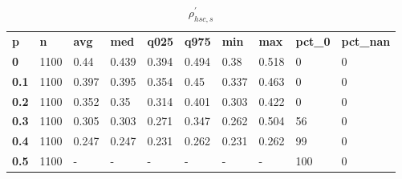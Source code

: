 \begin{table}[h]
 \centering 
\footnotesize
\caption{$\rho_{hsc,s}^\prime $}
\label{tab:alphahscs}
\begin{tabular}[h]{| l l l l l l l l l l|
    } \hline
\textbf{ p} & \textbf{ n} & \textbf{ avg} & \textbf{ med} & \textbf{ q025} & \textbf{ q975} & \textbf{ min} & \textbf{ max} & \textbf{ pct\_0} & \textbf{ pct\_nan}
           \\
  \textbf{  0} & 1100 &  0.44 & 0.439 & 0.394 & 0.494 &  0.38 & 0.518 &   0 & 0
           \\
  \textbf{0.1} & 1100 & 0.397 & 0.395 & 0.354 &  0.45 & 0.337 & 0.463 &   0 & 0
           \\
  \textbf{0.2} & 1100 & 0.352 &  0.35 & 0.314 & 0.401 & 0.303 & 0.422 &   0 & 0
           \\
  \textbf{0.3} & 1100 & 0.305 & 0.303 & 0.271 & 0.347 & 0.262 & 0.504 &  56 & 0
           \\
  \textbf{0.4} & 1100 & 0.247 & 0.247 & 0.231 & 0.262 & 0.231 & 0.262 &  99 & 0
           \\
  \textbf{0.5} & 1100 & - & - & - & - & - & - & 100 & 0
           \\
 \hline \end{tabular}
 \end{table}
